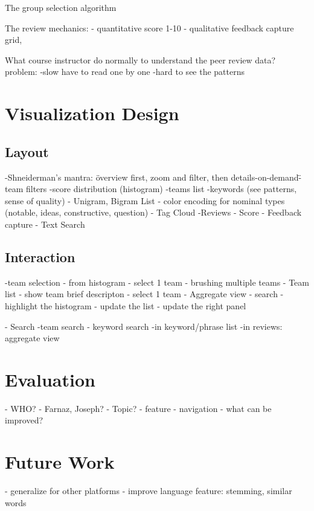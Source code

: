 \documentclass{sigchi}
\begin{document}
The group selection algorithm

The review mechanics: 
- quantitative score 1-10
- qualitative feedback capture grid,

What course instructor do normally to understand the peer review data?
  problem: 
    -slow have to read one by one 
    -hard to see the patterns


\section{Visualization Design}

\subsection{Layout}
-Shneiderman's mantra: \"overview first, zoom and filter, then details-on-demand\"
-team filters 
-score distribution (histogram)
-teams list
-keywords (see patterns, sense of quality)
  - Unigram, Bigram List
    - color encoding for nominal types (notable, ideas, constructive, question)
  - Tag Cloud
-Reviews
  - Score
  - Feedback capture
  - Text Search


\subsection{Interaction}

-team selection
  - from histogram
    - select 1 team
    - brushing multiple teams
  - Team list
    - show team brief descripton
    - select 1 team
  - Aggregate view
  - search 
    - highlight the histogram
    - update the list
    - update the right panel 

- Search
  -team search
  - keyword search
    -in keyword/phrase list
    -in reviews: aggregate view



\section{Evaluation}
- WHO?
  - Farnaz, Joseph?
- Topic?
  - feature
  - navigation
  - what can be improved?

\section{Future Work}
- generalize for other platforms
- improve language feature: stemming, similar words
\end{document}
